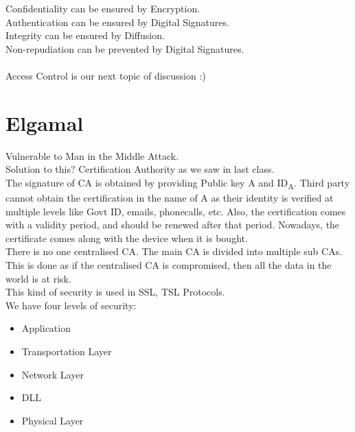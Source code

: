 \documentclass[english, 11pt]{article}
\begin{document}
Confidentiality can be ensured by Encryption.\\
Authentication can be ensured by Digital Signatures.\\
Integrity can be ensured by Diffusion.\\
Non-repudiation can be prevented by Digital Signatures.\\
\\
Access Control is our next topic of discussion :)
\\
\section*{Elgamal}
Vulnerable to Man in the Middle Attack.\\ 
Solution to this? Certification Authority as we saw in last class.\\
The signature of CA is obtained by providing Public key A and ID\textsubscript{A}. Third party cannot obtain the certification in the name of A as their identity is verified at multiple levels like Govt ID, emails, phonecalls, etc.
Also, the certification comes with a validity period, and should be renewed after that period. Nowadays, the certificate comes along with the device when it is bought.
\\
There is no one centralised CA. The main CA is divided into multiple sub CAs. This is done as if the centralised CA is compromised, then all the data in the world is at risk.
\\
This kind of security is used in SSL, TSL Protocols.
\\
We have four levels of security:
\begin{itemize}
  \item Application
  \item Transportation Layer
  \item Network Layer
  \item DLL
  \item Physical Layer
\end{itemize}
\end{document}
